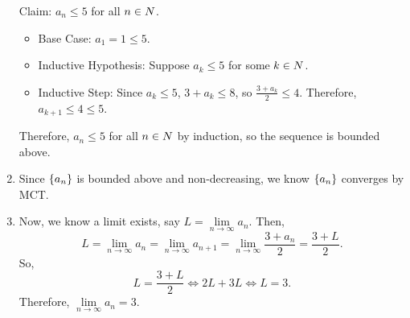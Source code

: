 \begin{Example}{}{}
\begin{enumerate}[(1)]
              Claim: $ a_n\le 5 $ for all $ n\in\relax{N} $.
              \begin{itemize}
                  \item Base Case: $ a_1=1\le 5 $.
                  \item Inductive Hypothesis: Suppose $ a_k\le 5 $
                        for some $ k\in\relax{N} $.
                  \item Inductive Step: Since $ a_k\le 5 $, $ 3+a_k\le 8 $,
                        so $ \frac{3+a_k}{2}\le 4 $. Therefore, $ a_{k+1}\le 4\le 5 $.
              \end{itemize}
              Therefore, $ a_n\le 5 $ for all $ n\in\relax{N} $ by induction,
              so the sequence is bounded above.
        \item Since $ \{a_n\} $ is bounded above and non-decreasing,
              we know $ \{a_n\} $ converges by MCT\@.
        \item Now, we know a limit exists, say $ L=\lim\limits_{{n} \to {\infty}}a_n $.
              Then,
              \[ L=\lim\limits_{{n} \to {\infty}}a_n=\lim\limits_{{n} \to {\infty}}a_{n+1}
                  =\lim\limits_{{n} \to {\infty}}\frac{3+a_n}{2}=\frac{3+L}{2}. \]
              So,
              \[ L=\frac{3+L}{2}\iff 2L+3L\iff L=3. \]
              Therefore, $ \lim\limits_{{n} \to {\infty}}a_n=3 $.
    \end{enumerate}
\end{Example}
